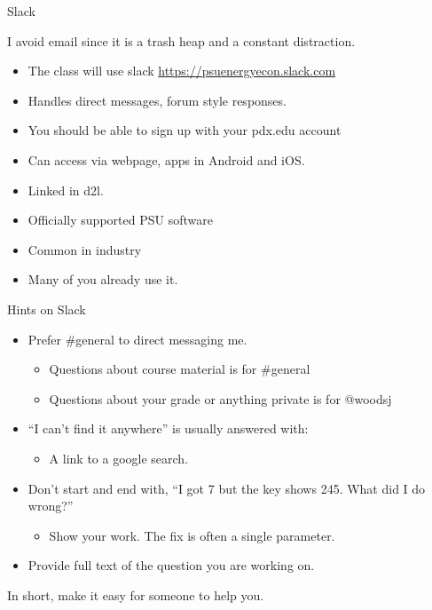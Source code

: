 \documentclass[
  ignorenonframetext,
]{beamer}
\providecommand{\tightlist}{%
  \setlength{\itemsep}{0pt}\setlength{\parskip}{0pt}}
\begin{document}
\begin{frame}{Slack}
\protect\hypertarget{slack}{}

I avoid email since it is a trash heap and a constant distraction.

\begin{itemize}
\tightlist
\item
  The class will use slack \url{https://psuenergyecon.slack.com}
\item
  Handles direct messages, forum style responses.
\item
  You should be able to sign up with your pdx.edu account
\item
  Can access via webpage, apps in Android and iOS.
\item
  Linked in d2l.
\item
  Officially supported PSU software
\item
  Common in industry
\item
  Many of you already use it.
\end{itemize}

\end{frame}

\begin{frame}{Hints on Slack}
\protect\hypertarget{hints-on-slack}{}

\begin{itemize}
\tightlist
\item
  Prefer \#general to direct messaging me.

  \begin{itemize}
  \tightlist
  \item
    Questions about course material is for \#general
  \item
    Questions about your grade or anything private is for @woodsj
  \end{itemize}
\item
  ``I can't find it anywhere'' is usually answered with:

  \begin{itemize}
  \tightlist
  \item
    A link to a google search.
  \end{itemize}
\item
  Don't start and end with, ``I got 7 but the key shows 245. What did I
  do wrong?''

  \begin{itemize}
  \tightlist
  \item
    Show your work. The fix is often a single parameter.
  \end{itemize}
\item
  Provide full text of the question you are working on.
\end{itemize}

In short, make it easy for someone to help you.

\end{frame}
\end{document}
